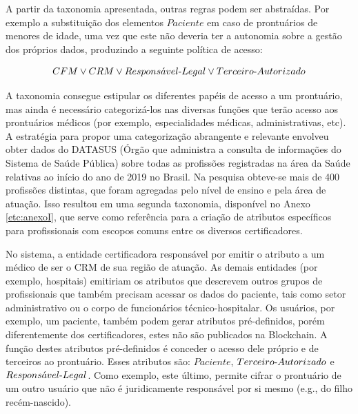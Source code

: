 \documentclass[a4paper,11pt]{article}
\begin{document}
A partir da taxonomia apresentada, outras regras podem ser abstraídas.
Por exemplo a substituição dos elementos $Paciente$ em caso de prontuários de menores de idade, uma vez que este não deveria ter a autonomia sobre a gestão dos próprios dados, produzindo a seguinte política de acesso:

\[ CFM \vee CRM \vee Respons\acute{a}vel\textnormal{-}Legal \vee Terceiro\textnormal{-}Autorizado \]

A taxonomia consegue estipular os diferentes papéis de acesso a um prontuário, mas ainda é necessário  categorizá-los nas diversas funções que terão acesso aos prontuários médicos (por exemplo, especialidades médicas, administrativas, etc).
A estratégia para propor uma categorização abrangente e relevante envolveu obter dados do DATASUS (Órgão que administra a consulta de informações do Sistema de Saúde Pública) sobre todas as profissões registradas na área da Saúde relativas ao início do ano de 2019 no Brasil.
Na pesquisa obteve-se mais de 400 profissões distintas, que foram agregadas pelo nível de ensino e pela área de atuação.
Isso resultou em uma segunda taxonomia, disponível no Anexo \ref{etc:anexoI}, que serve como referência para a criação de atributos específicos para profissionais com escopos comuns entre os diversos certificadores.

No sistema, a entidade certificadora responsável por emitir o atributo a um médico de ser o CRM de sua região de atuação. As demais entidades (por exemplo, hospitais) emitiriam os atributos que descrevem outros grupos de profissionais que também precisam acessar os dados do paciente, tais como setor administrativo ou o corpo de funcionários técnico-hospitalar.
Os usuários, por exemplo, um paciente, também podem gerar atributos pré-definidos, porém diferentemente dos certificadores, estes não são publicados na Blockchain.
A função destes atributos pré-definidos é conceder o acesso dele próprio e de terceiros ao prontuário.
Esses atributos são: $Paciente$, $Terceiro\textnormal{-}Autorizado$ e $Respons\acute{a}vel\textnormal{-}Legal$.
Como exemplo, este último, permite cifrar o prontuário de um outro usuário que não é juridicamente responsável por si mesmo (e.g., do filho recém-nascido).

\end{document}
